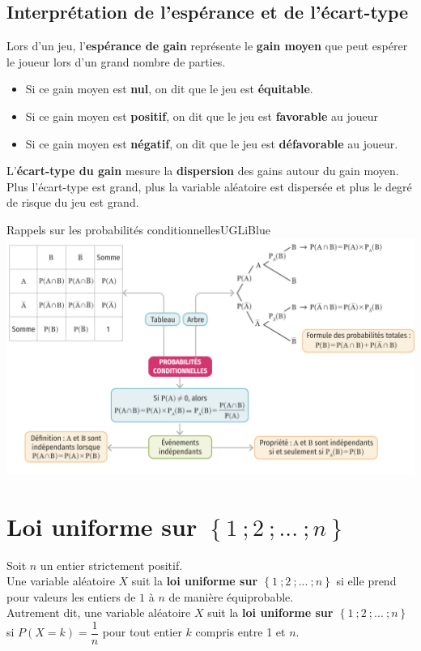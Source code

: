 \documentclass[a4paper,11pt,cours]{nsi} %
\begin{document}
\subsection*{Interprétation de l'espérance et de l'écart-type}
Lors d'un jeu, l'\textbf{espérance de gain} représente le \textbf{gain moyen} que peut espérer le joueur lors d'un grand nombre de parties.
\begin{itemize}
	\item 	Si ce gain moyen est \textbf{nul}, on dit que le jeu est \textbf{équitable}.
	\item 	Si ce gain moyen est \textbf{positif}, on dit que le jeu est \textbf{favorable} au joueur
	\item 	Si ce gain moyen est \textbf{négatif}, on dit que le jeu est \textbf{défavorable} au joueur.
\end{itemize}
L'\textbf{écart-type du gain} mesure la \textbf{dispersion} des gains autour du gain moyen.\\
Plus l'écart-type est grand, plus la variable aléatoire est dispersée et plus le degré de risque du jeu est grand.

\begin{encadrecolore}{Rappels sur les probabilités conditionnelles}{UGLiBlue}
	\includegraphics[width=16.5cm]{cartementale}
\end{encadrecolore}


\section{Loi uniforme sur $\left\{1\ ; 2\ ; ... \ ; n\right\}$}
\begin{definition}[]
    Soit $n$ un entier strictement positif.\\
    Une variable aléatoire $X$ suit la \textbf{loi uniforme sur $\left\{1\ ; 2\ ; ... \ ; n\right\}$} si elle prend pour valeurs les entiers de $1$ à $n$ de manière équiprobable.\\[.5em]
    Autrement dit, une variable aléatoire $X$ suit la \textbf{loi uniforme sur $\left\{1\ ; 2\ ; ... \ ; n\right\}$} si $P(X=k)=\dfrac{1}{n}$ pour tout entier $k$ compris entre 1 et $n$.
\end{definition}
\end{document}
